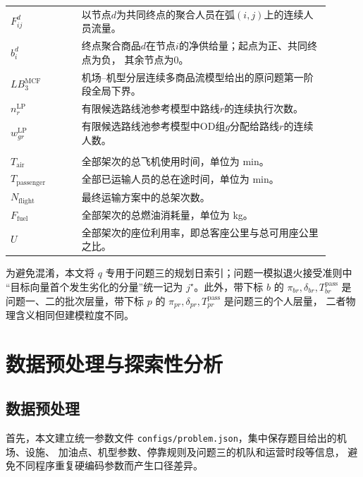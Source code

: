 \documentclass[UTF8,a4paper,zihao=5]{ctexart}
\begin{document}
\begin{longtable}{
    >{\centering\arraybackslash}p{0.20\linewidth}
    p{0.70\linewidth}
}
$F_{ij}^{d}$
& 以节点$d$为共同终点的聚合人员在弧$(i,j)$上的连续人员流量。 \\

$b_i^d$
& 终点聚合商品$d$在节点$i$的净供给量；起点为正、共同终点为负，
其余节点为0。 \\

$LB_3^{\mathrm{MCF}}$
& 机场--机型分层连续多商品流模型给出的原问题第一阶段全局下界。 \\

$n_r^{\mathrm{LP}}$
& 有限候选路线池参考模型中路线$r$的连续执行次数。 \\

$w_{gr}^{\mathrm{LP}}$
& 有限候选路线池参考模型中OD组$g$分配给路线$r$的连续人数。 \\

    \midrule
    \multicolumn{2}{l}{\textbf{评价指标}} \\[2pt]

    $T_{\mathrm{air}}$
    & 全部架次的总飞机使用时间，单位为 min。 \\

    $T_{\mathrm{passenger}}$
    & 全部已运输人员的总在途时间，单位为 min。 \\

    $N_{\mathrm{flight}}$
    & 最终运输方案中的总架次数。 \\

    $F_{\mathrm{fuel}}$
    & 全部架次的总燃油消耗量，单位为 kg。 \\

    $U$
    & 全部架次的座位利用率，即总客座公里与总可用座公里之比。 \\

\end{longtable}

为避免混淆，本文将 $q$ 专用于问题三的规划日索引；问题一模拟退火接受准则中
“目标向量首个发生劣化的分量”统一记为 $j^\star$。此外，带下标 $b$ 的
$\pi_{br},\delta_{br},T_{br}^{\mathrm{pass}}$ 是问题一、二的批次层量，带下标
$p$ 的 $\pi_{pr},\delta_{pr},T_{pr}^{\mathrm{pass}}$ 是问题三的个人层量，
二者物理含义相同但建模粒度不同。

\section{数据预处理与探索性分析}

\subsection{数据预处理}
首先，本文建立统一参数文件
\texttt{configs/problem.json}，集中保存题目给出的机场、设施、
加油点、机型参数、停靠规则及问题三的机队和运营时段等信息，
避免不同程序重复硬编码参数而产生口径差异。
\end{document}
